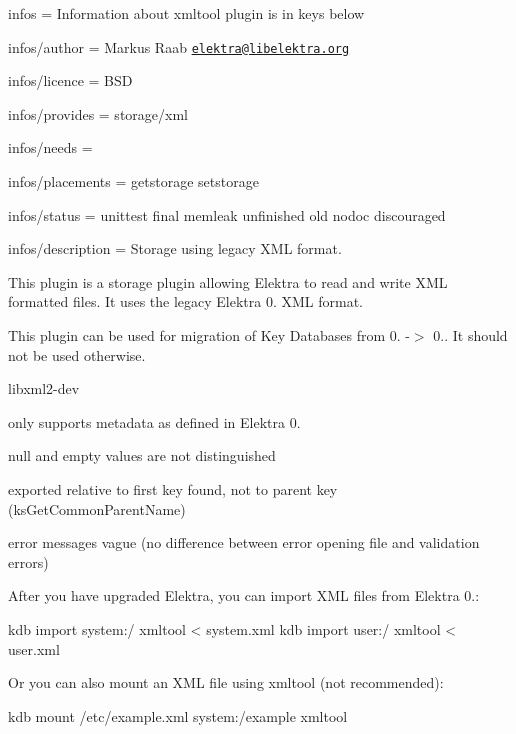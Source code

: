 
\begin{DoxyItemize}
\item infos = Information about xmltool plugin is in keys below
\item infos/author = Markus Raab \href{mailto:elektra@libelektra.org}{\tt elektra@libelektra.\+org}
\item infos/licence = B\+SD
\item infos/provides = storage/xml
\item infos/needs =
\item infos/placements = getstorage setstorage
\item infos/status = unittest final memleak unfinished old nodoc discouraged
\item infos/description = Storage using legacy X\+ML format.
\end{DoxyItemize}

This plugin is a storage plugin allowing Elektra to read and write X\+ML formatted files. It uses the legacy Elektra 0. X\+ML format.

This plugin can be used for migration of Key Databases from 0. -\/$>$ 0.. It should not be used otherwise.


\begin{DoxyItemize}
\item {\ttfamily libxml2-\/dev}
\end{DoxyItemize}


\begin{DoxyItemize}
\item only supports metadata as defined in Elektra 0.
\item null and empty values are not distinguished
\item exported relative to first key found, not to parent key (ks\+Get\+Common\+Parent\+Name)
\item error messages vague (no difference between error opening file and validation errors)
\end{DoxyItemize}

After you have upgraded Elektra, you can import X\+ML files from Elektra 0.\+:


\begin{DoxyCode}
kdb import system:/ xmltool < system.xml
kdb import user:/ xmltool < user.xml
\end{DoxyCode}


Or you can also mount an X\+ML file using {\ttfamily xmltool} (not recommended)\+:


\begin{DoxyCode}
kdb mount /etc/example.xml system:/example xmltool
\end{DoxyCode}
 
